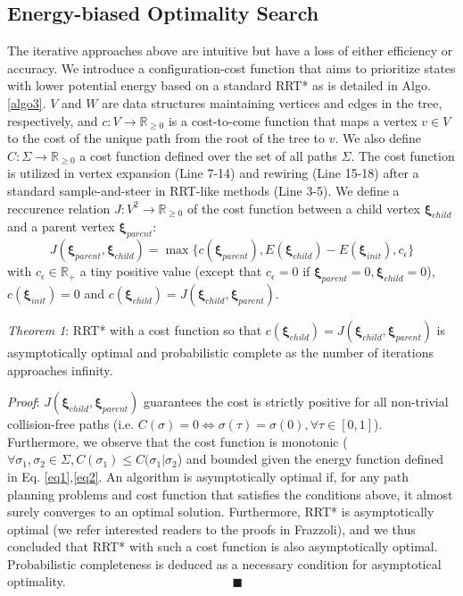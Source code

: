 \documentclass[conference]{IEEEtran}
\newcommand{\bxi}{\boldsymbol{\xi}}
\begin{document}
\subsection{Energy-biased Optimality Search}
The iterative approaches above are intuitive but have a loss of either efficiency or accuracy.
We introduce a configuration-cost function that aims to prioritize states with lower potential energy based on a standard RRT* as is detailed in Algo. \ref{algo3}.
$V$ and $W$ are data structures maintaining vertices and edges in the tree, respectively, and $c:V \rightarrow \mathbb{R}_{\geq 0}$ is a cost-to-come function that maps a vertex $v \in V$ to the cost of the unique path from the root of the tree to $v$. 
We also define $C:\Sigma \rightarrow \mathbb{R}_{\geq 0}$ a cost function defined over the set of all paths $\Sigma$.
The cost function is utilized in vertex expansion (Line 7-14) and rewiring  (Line 15-18) after a standard sample-and-steer in RRT-like methods (Line 3-5).
We define a reccurence relation $J: V^2 \rightarrow \mathbb{R}_{\geq 0}$ of the cost function between a child vertex $\bxi_{child}$ and a parent vertex $\bxi_{parent}$:
\begin{equation} \label{eq6}
	J(\bxi_{parent}, \bxi_{child}) = \max \{c(\boldsymbol{\xi}_{parent}), E(\boldsymbol{\xi}_{child}) - E(\bxi_{init}), c_{\epsilon}\}
\end{equation}
with $c_{\epsilon} \in \mathbb{R}_{+}$ a tiny positive value (except that $c_{\epsilon}=0$ if $\bxi_{parent}=0,\bxi_{child}=0$), $c(\bxi_{init})=0$ and $c(\bxi_{child}) = J(\bxi_{child}, \bxi_{parent})$.

\textit{Theorem 1}: RRT* with a cost function so that $c(\bxi_{child}) = J(\bxi_{child}, \bxi_{parent})$ is asymptotically optimal and probabilistic complete as the number of iterations approaches infinity.

\textit{Proof}: $J(\bxi_{child}, \bxi_{parent})$ guarantees the cost is strictly positive for all non-trivial collision-free paths (i.e. $C(\sigma)=0 \iff \sigma(\tau)=\sigma(0), \forall \tau \in [0,1]$).
Furthermore, we observe that the cost function is monotonic ($\forall \sigma_1, \sigma_2 \in \Sigma, C(\sigma_1) \leq C(\sigma_1 | \sigma_2$) and bounded given the energy function defined in Eq. \ref{eq1},\ref{eq2}.
An algorithm is asymptotically optimal if, for any path planning problems and cost function that satisfies the conditions above, it almost surely converges to an optimal solution.
Furthermore, RRT* is asymptotically optimal (we refer interested readers to the proofs in \cite{} Frazzoli), and we thus concluded that RRT* with such a cost function is also asymptotically optimal.
Probabilistic completeness is deduced as a necessary condition for asymptotical optimality. $\quad\quad\quad\quad\quad\quad\quad\quad\quad\quad\quad\quad\quad\blacksquare$
\end{document}

